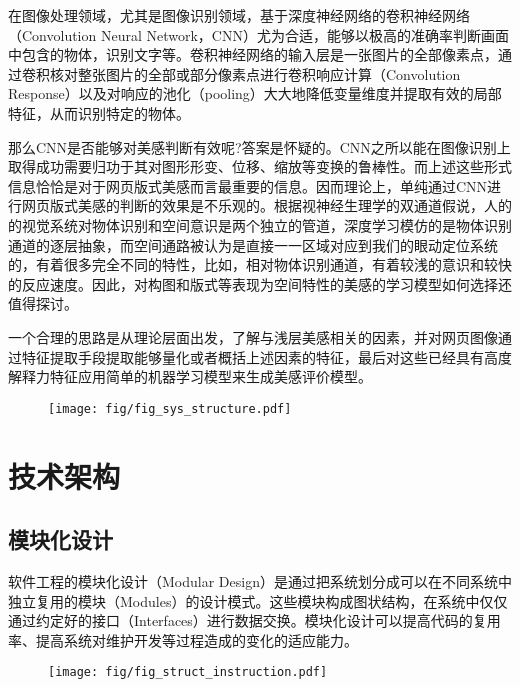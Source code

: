 在图像处理领域，尤其是图像识别领域，基于深度神经网络的卷积神经网络（Convolution Neural Network，CNN）尤为合适，能够以极高的准确率判断画面中包含的物体，识别文字等。卷积神经网络的输入层是一张图片的全部像素点，通过卷积核对整张图片的全部或部分像素点进行卷积响应计算（Convolution Response）以及对响应的池化（pooling）大大地降低变量维度并提取有效的局部特征，从而识别特定的物体。

那么CNN是否能够对美感判断有效呢?答案是怀疑的。CNN之所以能在图像识别上取得成功需要归功于其对图形形变、位移、缩放等变换的鲁棒性。而上述这些形式信息恰恰是对于网页版式美感而言最重要的信息。因而理论上，单纯通过CNN进行网页版式美感的判断的效果是不乐观的。根据视神经生理学的双通道假说\cite{Goodale1992}，人的的视觉系统对物体识别和空间意识是两个独立的管道，深度学习模仿的是物体识别通道的逐层抽象，而空间通路被认为是直接一一区域对应到我们的眼动定位系统的，有着很多完全不同的特性，比如，相对物体识别通道，有着较浅的意识和较快的反应速度。因此，对构图和版式等表现为空间特性的美感的学习模型如何选择还值得探讨。

一个合理的思路是从理论层面出发，了解与浅层美感相关的因素，并对网页图像通过特征提取手段提取能够量化或者概括上述因素的特征，最后对这些已经具有高度解释力特征应用简单的机器学习模型来生成美感评价模型。

\clearpage

\begin{figure}[H]
  \texttt{[image: fig/fig\_sys\_structure.pdf]}
\end{figure}

\section{技术架构}
\label{sec:app-tech}

\subsection{模块化设计}

软件工程的模块化设计（Modular Design）是通过把系统划分成可以在不同系统中独立复用的模块（Modules）的设计模式。这些模块构成图状结构，在系统中仅仅通过约定好的接口（Interfaces）进行数据交换。模块化设计可以提高代码的复用率、提高系统对维护开发等过程造成的变化的适应能力\cite{Baldwin2000}。

\begin{figure}[H]
  \centering
  \texttt{[image: fig/fig\_struct\_instruction.pdf]}
\end{figure}

